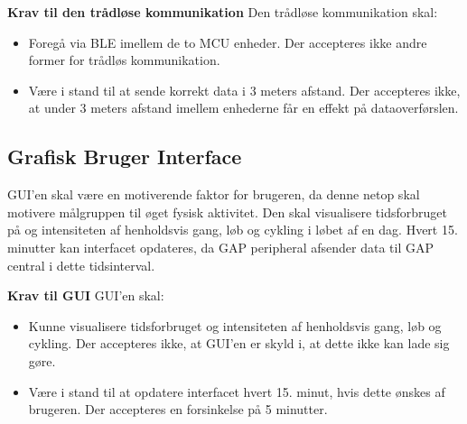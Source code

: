 \textbf{Krav til den trådløse kommunikation} \newline 
Den trådløse kommunikation skal:
\begin{itemize}
	\item Foregå via BLE imellem de to MCU enheder. Der accepteres ikke andre former for trådløs kommunikation.
	\item Være i stand til at sende korrekt data i 3 meters afstand. Der accepteres ikke, at under 3 meters afstand imellem enhederne får en effekt på dataoverførslen.
\end{itemize}

\subsection{Grafisk Bruger Interface}
GUI'en skal være en motiverende faktor for brugeren, da denne netop skal motivere målgruppen til øget fysisk aktivitet. Den skal visualisere tidsforbruget på og intensiteten af henholdsvis gang, løb og cykling i løbet af en dag. Hvert 15. minutter kan interfacet opdateres, da GAP peripheral afsender data til GAP central i dette tidsinterval.

\textbf{Krav til GUI} \newline 
GUI'en skal:
\begin{itemize}
	\item Kunne visualisere tidsforbruget og intensiteten af henholdsvis gang, løb og cykling. Der accepteres ikke, at GUI'en er skyld i, at dette ikke kan lade sig gøre.
	\item Være i stand til at opdatere interfacet hvert 15. minut, hvis dette ønskes af brugeren. Der accepteres en forsinkelse på 5 minutter.
\end{itemize}

